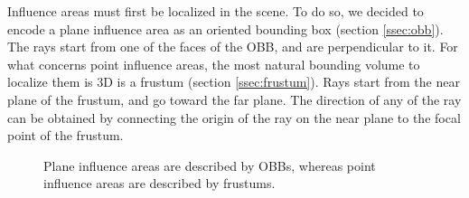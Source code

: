 \documentclass{PoliMi_MasterThesis}
\begin{document}
Influence areas must first be localized in the scene. To do so, we decided to encode a plane influence area as an oriented bounding box (section \ref{ssec:obb}). The rays start from one of the faces of the OBB, and are perpendicular to it. For what concerns point influence areas, the most natural bounding volume to localize them is 3D is a frustum (section \ref{ssec:frustum}). Rays start from the near plane of the frustum, and go toward the far plane. The direction of any of the ray can be obtained by connecting the origin of the ray on the near plane to the focal point of the frustum.

\begin{figure}[H]
    \centering
	\qquad
    \caption{Plane influence areas are described by OBBs, whereas point influence areas are described by frustums.}
    \label{fig:influence_areas}
\end{figure}
\end{document}
